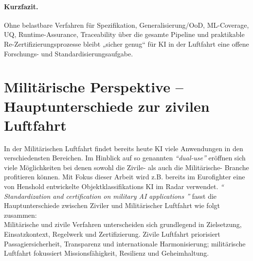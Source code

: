 \paragraph{Kurzfazit.}
Ohne belastbare Verfahren für Spezifikation, Generalisierung/OoD, ML-Coverage, UQ, Runtime-Assurance, Traceability über die gesamte Pipeline und praktikable Re-Zertifizierungsprozesse bleibt „sicher genug“ für KI in der Luftfahrt eine offene Forschungs- und Standardisierungsaufgabe.







\clearpage
\section{Militärische Perspektive – Hauptunterschiede zur zivilen Luftfahrt}
In der Militärischen Luftfahrt findet bereits heute KI viele Anwendungen in den verschiedensten Bereichen. 
Im Hinblick auf so genannten \textit{``dual-use''} eröffnen sich viele Möglichkeiten bei denen sowohl die Zivile- 
als auch die Militärische- Branche profitieren können. Mit Fokus dieser Arbeit wird z.B. bereits im Eurofighter 
eine von Henshold entwickelte Objektklassifikations KI im Radar verwendet.
\textit{`` Standardization and certification on military AI applications ''} fasst die Hauptunterschiede zwischen Ziviler und Militärischer 
Luftfahrt wie folgt zusammen:\\
Militärische und zivile Verfahren unterscheiden sich grundlegend in Zielsetzung, Einsatzkontext, Regelwerk und Zertifizierung. 
Zivile Luftfahrt priorisiert Passagiersicherheit, Transparenz und internationale Harmonisierung; militärische Luftfahrt fokussiert 
Missionsfähigkeit, Resilienz und Geheimhaltung.

